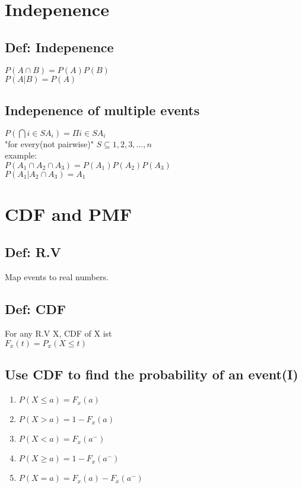 \section{Indepenence}
    \subsection*{Def: Indepenence}
        $P(A \cap B) = P(A)P(B)$\\
        $P(A|B) = P(A)$\\

    \subsection*{Indepenence of multiple events}
        $P(\bigcap{i \in S}A_i) = \Pi{i \in S}A_i$\\
        "for every(not pairwise)"
        $S \subseteq {1, 2, 3,...,n}$\\
        example:\\
        $P(A_1 \cap A_2 \cap A_3) = P(A_1)P(A_2)P(A_3)$\\
        $P(A_1| A_2 \cap A_3) = A_1$

\section{CDF and PMF}
    \subsection*{Def: R.V}
        Map events to real numbers.\\
    
    \subsection*{Def: CDF}
        For any R.V X, CDF of X ist\\
        $F_x(t)=P_x(X \leq t)$

    \subsection*{Use CDF to find the probability of an event(I)}
        \begin{enumerate}
            \item $P(X\leq a)=F_x(a)$
            \item $P(X>a)=1-F_x(a)$
            \item $P(X<a)=F_x(a^-)$
            \item $P(X\geq a)=1-F_x(a^-)$
            \item $P(X=a)=F_x(a)-F_x(a^-)$
        \end{enumerate}


